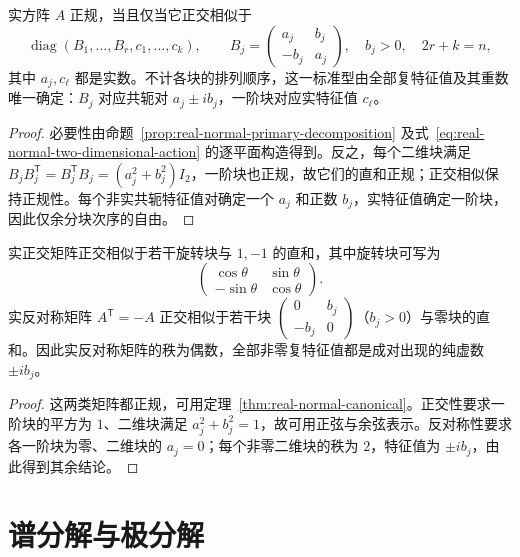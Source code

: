 \begin{theorem}[实正规矩阵的标准型]
\label{thm:real-normal-canonical}
实方阵 $A$ 正规，当且仅当它正交相似于
\begin{equation}
\label{eq:real-normal-canonical}
    \operatorname{diag}(B_1,\ldots,B_r,c_1,\ldots,c_k),
    \qquad B_j=\begin{pmatrix}a_j&b_j\\-b_j&a_j\end{pmatrix},
    \quad b_j>0,\quad 2r+k=n,
\end{equation}
其中 $a_j,c_\ell$ 都是实数。不计各块的排列顺序，这一标准型由全部复特征值及其重数唯一确定：$B_j$ 对应共轭对 $a_j\pm ib_j$，一阶块对应实特征值 $c_\ell$。
\end{theorem}
\begin{proof}
必要性由命题~\ref{prop:real-normal-primary-decomposition} 及式~\eqref{eq:real-normal-two-dimensional-action} 的逐平面构造得到。反之，每个二维块满足 $B_jB_j^{\mathsf T}=B_j^{\mathsf T}B_j=(a_j^2+b_j^2)I_2$，一阶块也正规，故它们的直和正规；正交相似保持正规性。每个非实共轭特征值对确定一个 $a_j$ 和正数 $b_j$，实特征值确定一阶块，因此仅余分块次序的自由。
\end{proof}

\begin{corollary}
\label{cor:orthogonal-skew-canonical}
实正交矩阵正交相似于若干旋转块与 $1,-1$ 的直和，其中旋转块可写为
\[
    \begin{pmatrix}\cos\theta&\sin\theta\\
    -\sin\theta&\cos\theta\end{pmatrix}.
\]
实反对称矩阵 $A^{\mathsf T}=-A$ 正交相似于若干块 $\begin{pmatrix}0&b_j\\-b_j&0\end{pmatrix}$（$b_j>0$）与零块的直和。因此实反对称矩阵的秩为偶数，全部非零复特征值都是成对出现的纯虚数 $\pm ib_j$。
\end{corollary}
\begin{proof}
这两类矩阵都正规，可用定理~\ref{thm:real-normal-canonical}。正交性要求一阶块的平方为 $1$、二维块满足 $a_j^2+b_j^2=1$，故可用正弦与余弦表示。反对称性要求各一阶块为零、二维块的 $a_j=0$；每个非零二维块的秩为 $2$，特征值为 $\pm ib_j$，由此得到其余结论。
\end{proof}

\section{谱分解与极分解}
\label{sec:spectral-polar-decomposition}

